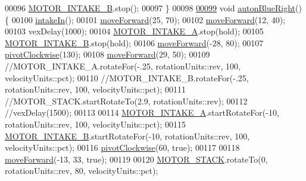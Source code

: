 \begin{DoxyCode}
00096   \mbox{\hyperlink{declarations_8h_a5ae79e7ed71b0b94b3983c22c60c2eaa_a5ae79e7ed71b0b94b3983c22c60c2eaa}{MOTOR\_INTAKE\_B}}.stop();
00097 \}
00098 
\mbox{\hyperlink{auton_8cpp_ab9984e9a12048995fb71a06a1c94fd31_ab9984e9a12048995fb71a06a1c94fd31}{00099}} \textcolor{keywordtype}{void} \mbox{\hyperlink{auton_8cpp_ab9984e9a12048995fb71a06a1c94fd31_ab9984e9a12048995fb71a06a1c94fd31}{autonBlueRight}}()\{
00100   \mbox{\hyperlink{drive_8h_aa0846c73538fc48569a7c7c3689a59f0_aa0846c73538fc48569a7c7c3689a59f0}{intakeIn}}();
00101   \mbox{\hyperlink{auton_8cpp_af5833bec4b862d3da7fc3700ca7d2a6b_af5833bec4b862d3da7fc3700ca7d2a6b}{moveForward}}(25, 70);
00102   \mbox{\hyperlink{auton_8cpp_af5833bec4b862d3da7fc3700ca7d2a6b_af5833bec4b862d3da7fc3700ca7d2a6b}{moveForward}}(12, 40);
00103   vexDelay(1000);
00104   \mbox{\hyperlink{declarations_8h_a34de211d15bfb3c0ac450597fd96b4fc_a34de211d15bfb3c0ac450597fd96b4fc}{MOTOR\_INTAKE\_A}}.stop(hold);
00105   \mbox{\hyperlink{declarations_8h_a5ae79e7ed71b0b94b3983c22c60c2eaa_a5ae79e7ed71b0b94b3983c22c60c2eaa}{MOTOR\_INTAKE\_B}}.stop(hold);
00106   \mbox{\hyperlink{auton_8cpp_af5833bec4b862d3da7fc3700ca7d2a6b_af5833bec4b862d3da7fc3700ca7d2a6b}{moveForward}}(-28, 80);
00107   \mbox{\hyperlink{auton_8cpp_a362446334157b1edf93062607b0f5e4c_a362446334157b1edf93062607b0f5e4c}{pivotClockwise}}(130);
00108   \mbox{\hyperlink{auton_8cpp_af5833bec4b862d3da7fc3700ca7d2a6b_af5833bec4b862d3da7fc3700ca7d2a6b}{moveForward}}(29, 50);
00109   \textcolor{comment}{//MOTOR\_INTAKE\_A.rotateFor(-.25, rotationUnits::rev, 100, velocityUnits::pct);}
00110   \textcolor{comment}{//MOTOR\_INTAKE\_B.rotateFor(-.25, rotationUnits::rev, 100, velocityUnits::pct);}
00111   \textcolor{comment}{//MOTOR\_STACK.startRotateTo(2.9, rotationUnits::rev);}
00112   \textcolor{comment}{//vexDelay(1500);}
00113   
00114   \mbox{\hyperlink{declarations_8h_a34de211d15bfb3c0ac450597fd96b4fc_a34de211d15bfb3c0ac450597fd96b4fc}{MOTOR\_INTAKE\_A}}.startRotateFor(-10, rotationUnits::rev, 100, velocityUnits::pct);
00115   \mbox{\hyperlink{declarations_8h_a5ae79e7ed71b0b94b3983c22c60c2eaa_a5ae79e7ed71b0b94b3983c22c60c2eaa}{MOTOR\_INTAKE\_B}}.startRotateFor(-10, rotationUnits::rev, 100, velocityUnits::pct);
00116   \mbox{\hyperlink{auton_8cpp_a362446334157b1edf93062607b0f5e4c_a362446334157b1edf93062607b0f5e4c}{pivotClockwise}}(60, \textcolor{keyword}{true});
00117 
00118   \mbox{\hyperlink{auton_8cpp_af5833bec4b862d3da7fc3700ca7d2a6b_af5833bec4b862d3da7fc3700ca7d2a6b}{moveForward}}(-13, 33, \textcolor{keyword}{true});
00119   
00120   \mbox{\hyperlink{declarations_8h_a212c888d64ffcd7e7b44a548fa0408a9_a212c888d64ffcd7e7b44a548fa0408a9}{MOTOR\_STACK}}.rotateTo(0, rotationUnits::rev, 80, velocityUnits::pct);

\end{DoxyCode}
